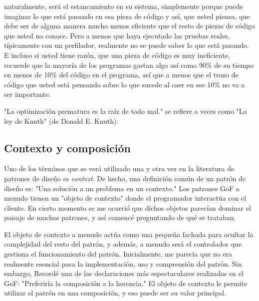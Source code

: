 

naturalmente, será el estancamiento en su sistema, simplemente porque puede imaginar lo que está pasando en esa pieza de código y así, que usted piensa, que debe ser de alguna manera mucho menos eficiente que el resto de piezas de código que usted no conoce. Pero a menos que haya ejecutado las pruebas reales, típicamente con un perfilador, realmente no se puede saber lo que está pasando. E incluso si usted tiene razón, que una pieza de código es muy ineficiente, recuerde que la mayoría de los programas gastan algo así como 90\% de su tiempo en menos de 10\% del código en el programa, así que a menos que el trozo de código que usted está pensando sobre lo que sucede al caer en ese 10\% no va a ser importante. \newline

"La optimización prematura es la raíz de todo mal." se refiere a veces como "La ley de Knuth" (de Donald E. Knuth).
 
\subsection*{Contexto y composición}
\label{sec:concom}

Uno de los términos que se verá utilizado una y otra vez en la literatura de patrones de diseño es \textit{context}. De hecho, una definición común de un patrón de diseño es: "Una solución a un problema en un contexto." Los patrones GoF a menudo tienen un "objeto de contexto" donde el programador interactúa con el cliente. En cierto momento se me ocurrió que dichos objetos parecían dominar el paisaje de muchos patrones, y así comencé preguntando de qué se trataban. \newline

El objeto de contexto a menudo actúa como una pequeña fachada para ocultar la complejidad del resto del patrón, y además, a menudo será el controlador que gestiona el funcionamiento del patrón. Inicialmente, me parecía que no era realmente esencial para la implementación, uso y comprensión del patrón. Sin embargo, Recordé una de las declaraciones más espectaculares realizadas en el GoF: 
 "Preferiría la composición a la herencia." El objeto de contexto le permite utilizar el patrón en una composición, y eso puede ser su valor principal.
\newpage
